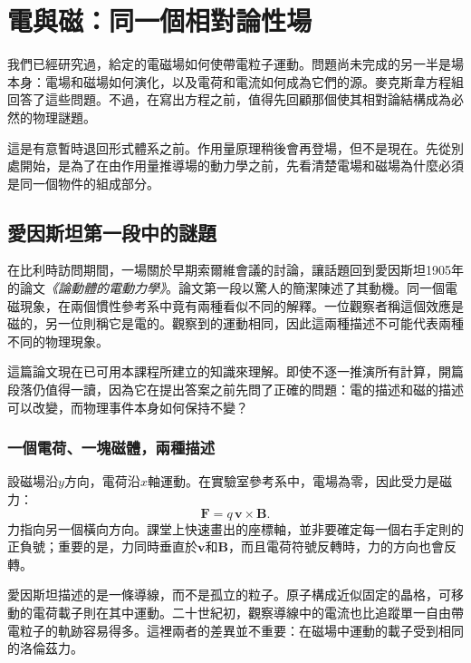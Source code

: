 \chapter{電與磁：同一個相對論性場}

我們已經研究過，給定的電磁場如何使帶電粒子運動。問題尚未完成的另一半是場本身：電場和磁場如何演化，以及電荷和電流如何成為它們的源。麥克斯韋方程組回答了這些問題。不過，在寫出方程之前，值得先回顧那個使其相對論結構成為必然的物理謎題。

這是有意暫時退回形式體系之前。作用量原理稍後會再登場，但不是現在。先從別處開始，是為了在由作用量推導場的動力學之前，先看清楚電場和磁場為什麼必須是同一個物件的組成部分。

\section{愛因斯坦第一段中的謎題}

在比利時訪問期間，一場關於早期索爾維會議的討論，讓話題回到愛因斯坦1905年的論文\emph{《論動體的電動力學》}。論文第一段以驚人的簡潔陳述了其動機。同一個電磁現象，在兩個慣性參考系中竟有兩種看似不同的解釋。一位觀察者稱這個效應是磁的，另一位則稱它是電的。觀察到的運動相同，因此這兩種描述不可能代表兩種不同的物理現象。

這篇論文現在已可用本課程所建立的知識來理解。即使不逐一推演所有計算，開篇段落仍值得一讀，因為它在提出答案之前先問了正確的問題：電的描述和磁的描述可以改變，而物理事件本身如何保持不變？

\subsection{一個電荷、一塊磁體，兩種描述}

設磁場沿\(y\)方向，電荷沿\(x\)軸運動。在實驗室參考系中，電場為零，因此受力是磁力：
\begin{equation}
\mathbf F=q\,\mathbf v\times\mathbf B.
\end{equation}
力指向另一個橫向方向。課堂上快速畫出的座標軸，並非要確定每一個右手定則的正負號；重要的是，力同時垂直於\(\mathbf v\)和\(\mathbf B\)，而且電荷符號反轉時，力的方向也會反轉。

\begin{classroomqa}
\end{classroomqa}

愛因斯坦描述的是一條導線，而不是孤立的粒子。原子構成近似固定的晶格，可移動的電荷載子則在其中運動。二十世紀初，觀察導線中的電流也比追蹤單一自由帶電粒子的軌跡容易得多。這裡兩者的差異並不重要：在磁場中運動的載子受到相同的洛倫茲力。

